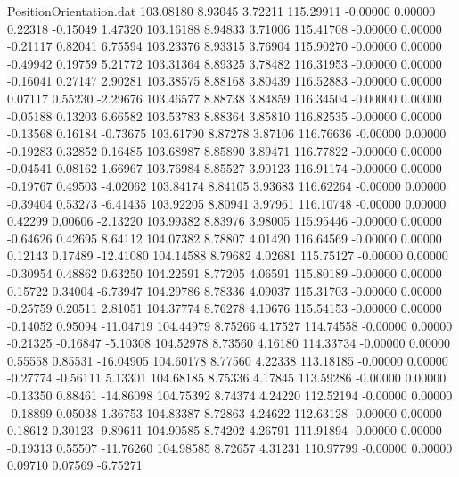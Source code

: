 \begin{filecontents}{PositionOrientation.dat}
 103.08180    8.93045    3.72211   115.29911   -0.00000    0.00000    0.22318   -0.15049    1.47320
 103.16188    8.94833    3.71006   115.41708   -0.00000    0.00000   -0.21117    0.82041    6.75594
 103.23376    8.93315    3.76904   115.90270   -0.00000    0.00000   -0.49942    0.19759    5.21772
 103.31364    8.89325    3.78482   116.31953   -0.00000    0.00000   -0.16041    0.27147    2.90281
 103.38575    8.88168    3.80439   116.52883   -0.00000    0.00000    0.07117    0.55230   -2.29676
 103.46577    8.88738    3.84859   116.34504   -0.00000    0.00000   -0.05188    0.13203    6.66582
 103.53783    8.88364    3.85810   116.82535   -0.00000    0.00000   -0.13568    0.16184   -0.73675
 103.61790    8.87278    3.87106   116.76636   -0.00000    0.00000   -0.19283    0.32852    0.16485
 103.68987    8.85890    3.89471   116.77822   -0.00000    0.00000   -0.04541    0.08162    1.66967
 103.76984    8.85527    3.90123   116.91174   -0.00000    0.00000   -0.19767    0.49503   -4.02062
 103.84174    8.84105    3.93683   116.62264   -0.00000    0.00000   -0.39404    0.53273   -6.41435
 103.92205    8.80941    3.97961   116.10748   -0.00000    0.00000    0.42299    0.00606   -2.13220
 103.99382    8.83976    3.98005   115.95446   -0.00000    0.00000   -0.64626    0.42695    8.64112
 104.07382    8.78807    4.01420   116.64569   -0.00000    0.00000    0.12143    0.17489  -12.41080
 104.14588    8.79682    4.02681   115.75127   -0.00000    0.00000   -0.30954    0.48862    0.63250
 104.22591    8.77205    4.06591   115.80189   -0.00000    0.00000    0.15722    0.34004   -6.73947
 104.29786    8.78336    4.09037   115.31703   -0.00000    0.00000   -0.25759    0.20511    2.81051
 104.37774    8.76278    4.10676   115.54153   -0.00000    0.00000   -0.14052    0.95094  -11.04719
 104.44979    8.75266    4.17527   114.74558   -0.00000    0.00000   -0.21325   -0.16847   -5.10308
 104.52978    8.73560    4.16180   114.33734   -0.00000    0.00000    0.55558    0.85531  -16.04905
 104.60178    8.77560    4.22338   113.18185   -0.00000    0.00000   -0.27774   -0.56111    5.13301
 104.68185    8.75336    4.17845   113.59286   -0.00000    0.00000   -0.13350    0.88461  -14.86098
 104.75392    8.74374    4.24220   112.52194   -0.00000    0.00000   -0.18899    0.05038    1.36753
 104.83387    8.72863    4.24622   112.63128   -0.00000    0.00000    0.18612    0.30123   -9.89611
 104.90585    8.74202    4.26791   111.91894   -0.00000    0.00000   -0.19313    0.55507  -11.76260
 104.98585    8.72657    4.31231   110.97799   -0.00000    0.00000    0.09710    0.07569   -6.75271

\end{filecontents}
